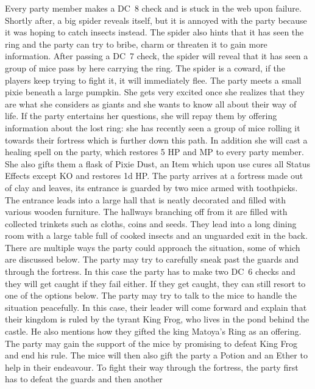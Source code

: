 \documentclass[a4paper, titlepage, 11pt, twocolumn] {article}
\begin{document}
Every party member makes a DC~8 check and is stuck in the web upon failure.
Shortly after, a big spider reveals itself, but it is annoyed with the party because it was hoping to catch insects instead.
The spider also hints that it has seen the ring and the party can try to bribe, charm or threaten it to gain more information.
After passing a DC~7 check, the spider will reveal that it has seen a group of mice pass by here carrying the ring.
The spider is a coward, if the players keep trying to fight it, it will immediately flee. 
%
%
\vfill
%
%
%
 The party meets a small pixie beneath a large pumpkin.
She gets very excited once she realizes that they are what she considers as giants and she wants to know all about their way of life.
If the party entertains her questions, she will repay them by offering information about the lost ring:
she has recently seen a group of mice rolling it towards their fortress which is further down this path.
In addition she will cast a healing spell on the party, which restores 5 HP and MP to every party member.
She also gifts them a flask of Pixie Dust, an Item which upon use cures all Status Effects except KO and restores 1d HP.
%
\vfill
%
 The party arrives at a fortress made out of clay and leaves, its entrance is guarded by two mice armed with toothpicks.
The entrance leads into a large hall that is neatly decorated and filled with various wooden furniture.
The hallways branching off from it are filled with collected trinkets such as cloths, coins and seeds.
They lead into a \newpage long dining room with a large table full of cooked insects and an unguarded exit in the back.
There are multiple ways the party could approach the situation, some of which are discussed below.
%
\ofrow
%
 The party may try to carefully sneak past the guards and through the fortress.
In this case the party has to make two DC~6 checks and they will get caught if they fail either.
If they get caught, they can still resort to one of the options below.
%
\ofrow
%
 The party may try to talk to the mice to handle the situation peacefully.
In this case, their leader will come forward and explain that their kingdom is ruled by the tyrant King Frog, who lives in the pond behind the castle.
He also mentions how they gifted the king Matoya's Ring as an offering.
The party may gain the support of the mice by promising to defeat King Frog and end his rule.
The mice will then also gift the party a Potion and an Ether to help in their endeavour.
%
\ofrow
%
 To fight their way through the fortress, the party first has to defeat the guards and then another
\end{document}
